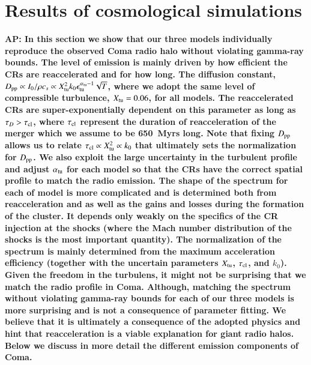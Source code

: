 \documentclass[a4paper,fleqn,usenatbib]{mnras}
\def\AP#1{{\bf  AP: #1}}
\begin{document}

\section{Results of cosmological simulations}
\label{sec:results}
\AP{In this section we show that our three models individually
  reproduce the observed Coma radio halo without violating gamma-ray
  bounds. The level of emission is mainly driven by how efficient the
  CRs are reaccelerated and for how long. The diffusion constant,
  $D_{\mathrm{pp}}\propto I_0/\rho c_s \propto
  X_{\mathrm{tu}}^2k_0\epsilon_{\mathrm{tu}}^{\alpha_{\mathrm{tu}}-1}\sqrt{T}$, where
  we adopt the same level of compressible turbulence,
  $X_{\mathrm{tu}}=0.06$, for all models. The reaccelerated CRs are
  super-exponentially dependent on this parameter as long as $\tau_D >
  \tau_{\mathrm{cl}}$, where $\tau_{\mathrm{cl}}$ represent the duration of
  reacceleration of the merger which we assume to be 650~Myrs
  long. Note that  fixing $D_{\mathrm{pp}}$ allows us to relate
  $\tau_{\mathrm{cl}} \propto X_{\mathrm{tu}}^2 \propto k_0$ that ultimately sets
  the normalization for $D_{\mathrm{pp}}$. We also exploit the large
  uncertainty in the turbulent profile and adjust $\alpha_{\mathrm{tu}}$
  for each model so that the CRs have the correct spatial profile to
  match the radio emission. The shape of the spectrum for each of
  model is more complicated and is determined both from reacceleration
  and as well as the gains and losses during the formation of the
  cluster. It depends only weakly on the specifics of the CR injection
  at the shocks (where the Mach number distribution of the shocks is
  the most important quantity). The normalization of the spectrum is
  mainly determined from the maximum acceleration efficiency (together
  with the uncertain parameters $X_{\mathrm{tu}}$, $\tau_{\mathrm{cl}}$, and
  $k_0$). Given the freedom in the turbulens, it might not be
  surprising that we match the radio profile in Coma. Although,
  matching the spectrum without violating gamma-ray bounds for each of
  our three models is more surprising and is not a consequence of
  parameter fitting. We believe that it is ultimately a consequence of
  the adopted physics and hint that reacceleration is a viable
  explanation for giant radio halos. Below we discuss in more detail
  the different emission components of Coma.}
\end{document}
